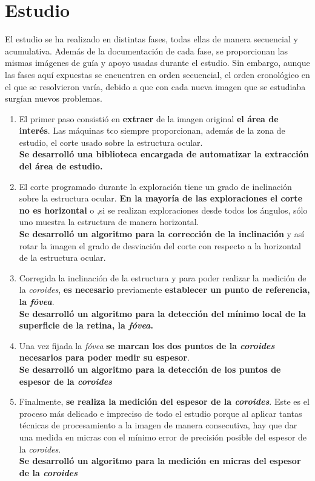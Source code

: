 \section{Estudio}
El estudio se ha realizado en distintas fases, todas ellas de manera
secuencial y acumulativa. Además de la documentación de cada fase, se
proporcionan las mismas imágenes de guía y apoyo usadas durante el
estudio.  Sin embargo, aunque las fases aquí expuestas se encuentren
en orden secuencial, el orden cronológico en el que se resolvieron
varía, debido a que con cada nueva imagen que se estudiaba surgían
nuevos problemas.
\begin{enumerate}
\item El primer paso consistió en \textbf{extraer} de la imagen
  original \textbf{el área de interés}. Las máquinas \gls{tco}
  siempre proporcionan, además
  de la zona de estudio, el corte usado sobre la estructura ocular. \\
  \textbf{Se desarrolló una biblioteca encargada de automatizar la
    extracción del área de estudio.}
\item El corte programado durante la exploración tiene un grado de
  inclinación sobre la estructura ocular. \textbf{En la mayoría de las
    exploraciones el corte no es horizontal} o ,si se realizan
  exploraciones desde todos los ángulos, sólo uno muestra la estructura
  de manera horizontal. \\
  \textbf{Se desarrolló un algoritmo para la corrección de la
    inclinación} y así rotar la imagen el grado de desviación del
  corte con respecto a la horizontal de la estructura ocular.
\item Corregida la inclinación de la estructura y para poder realizar
  la medición de la \emph{coroides}, \textbf{es necesario} previamente
  \textbf{establecer un punto de referencia, la \emph{fóvea}}. \\
  \textbf{Se desarrolló un algoritmo para la detección del mínimo
    local de la superficie de la retina, la \emph{fóvea}.}
\item Una vez fijada la \emph{fóvea} \textbf{se marcan los dos puntos
    de la \emph{coroides} necesarios para poder medir su espesor}. \\
  \textbf{Se desarrolló un algoritmo para la detección de los puntos
    de espesor de la \emph{coroides}}
\item Finalmente, \textbf{se realiza la medición del espesor de la
    \emph{coroides}}. Este es el proceso más delicado e impreciso de
  todo el estudio porque al aplicar tantas técnicas de procesamiento a
  la imagen de manera consecutiva, hay que dar una medida en micras
  con el mínimo error de precisión posible del espesor de la \emph{coroides}. \\
  \textbf{Se desarrolló un algoritmo para la medición en micras del
    espesor de la \emph{coroides}}
\end{enumerate}


